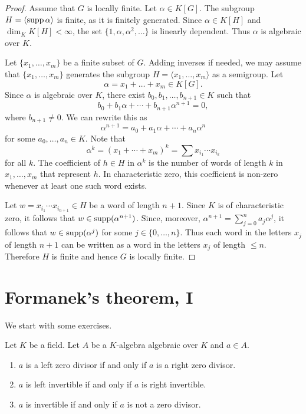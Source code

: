 \begin{proof}
	Assume that $G$ is locally finite. Let $\alpha\in K[G]$. The subgroup 
	$H=\langle\operatorname{supp}\alpha\rangle$ is finite, as it is finitely generated. Since 
	$\alpha\in K[H]$ and $\dim_KK[H]<\infty$, the set 
	$\{1,\alpha,\alpha^2,\dots\}$ is linearly dependent. Thus $\alpha$ is
	algebraic over $K$.

	Let $\{x_1,\dots,x_m\}$ be a finite subset of $G$. Adding inverses if needed,
	we may assume that $\{x_1,\dots,x_m\}$ generates the subgroup 
	$H=\langle x_1,\dots,x_m\rangle$ as a semigroup. Let 
	\[
	\alpha=x_1+\dots+x_m\in K[G].
	\]
	Since $\alpha$ is algebraic over $K$, 
	there exist $b_0,b_1,\dots,b_{n+1}\in K$ such that 
	\[
	b_0+b_1\alpha+\cdots+b_{n+1}\alpha^{n+1}=0,
	\]
	where $b_{n+1}\ne 0$. We can rewrite this as 
	\[
		\alpha^{n+1}=a_0+a_1\alpha+\cdots+a_n\alpha^n
	\]
	for some $a_0,\dots,a_n\in K$. 
	Note that 
	\[
		\alpha^{k}=(x_1+\cdots+x_m)^{k}
		=\sum x_{i_1}\cdots x_{i_{k}}
	\]
	for all $k$. 
	The coefficient of $h\in H$ in $\alpha^k$ is the number
	of words of length $k$ in $x_1,\dots,x_m$ that represent $h$.
	In characteristic zero, this coefficient is non-zero whenever
	at least one such word exists.
 
        Let $w=x_{i_1}\cdots
	x_{i_{n+1}}\in H$ be a word of length $n+1$. 
		Since $K$
	is of characteristic zero, it follows that $w\in\operatorname{supp}(\alpha^{n+1})$. Since, moreover,  
	$\alpha^{n+1}=\sum_{j=0}^na_j\alpha^j$, it follows that 
	$w\in\operatorname{supp}(\alpha^j)$ for some $j\in\{0,\dots,n\}$. Thus each
	word in the letters $x_j$ of length $n+1$ can be written as a word in the letters $x_j$ of 
	length $\leq n$. Therefore $H$ is finite and hence $G$ is locally finite. 
\end{proof}


\section{Formanek's theorem, I}

We start with some exercises. 

\begin{exercise}
\label{xca:invertible_algebraic}
	Let $K$ be a field. Let $A$ be a $K$-algebra algebraic over $K$ and $a\in A$.
	\begin{enumerate}
		\item $a$ is a left zero divisor if and only if $a$ is a right zero divisor.
		\item $a$ is left invertible if and only if $a$ is right invertible.
		\item $a$ is invertible if and only if $a$ is not a zero divisor.
	\end{enumerate}
\end{exercise}

